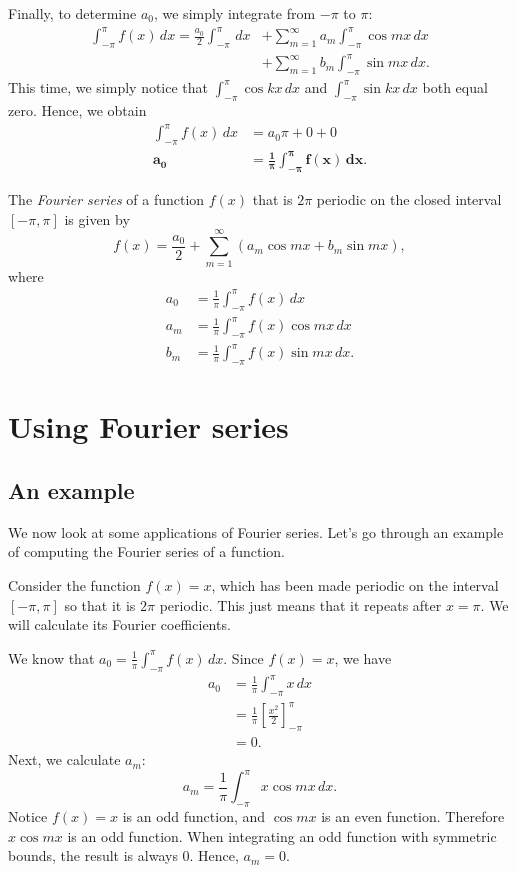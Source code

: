 \documentclass{amsart}
\begin{document}
  Finally, to determine $a_0$, we simply integrate from $-\pi$ to $\pi$:
  \begin{align*}
    \int_{-\pi}^{\pi} f(x)\, dx = \frac{a_0}{2} \int_{-\pi}^{\pi} \, dx &+ \sum_{m=1}^{\infty} a_m \int_{-\pi}^{\pi} \cos mx\, dx \\
                                &+ \sum_{m=1}^{\infty} b_m \int_{-\pi}^{\pi} \sin mx\, dx.
  \end{align*}
  This time, we simply notice that $\int_{-\pi}^{\pi} \cos kx\, dx $ and $\int_{-\pi}^{\pi} \sin kx\, dx$ both equal zero. Hence, we obtain 
  \begin{align*}
    \int_{-\pi}^{\pi} f(x) \, dx &= a_0 \pi + 0 + 0 \\
    \bm{a_0} &\bm{= \frac{1}{\pi} \int_{-\pi}^{\pi} f(x) \, dx}. 
  \end{align*}
  \begin{definition}
    The \emph{Fourier series} of a function $f(x)$ that is $2\pi$ periodic on the closed interval  $[-\pi, \pi]$ is given by \[
      f(x) = \frac{a_0}{2} + \sum_{m=1}^{\infty} (a_m \cos mx + b_m \sin mx)
    ,\] where 
    \begin{align*}
      a_0 &= \frac{1}{\pi}\int_{-\pi}^{\pi} f(x)\, dx \\
      a_m &= \frac{1}{\pi}\int_{-\pi}^{\pi} f(x)\cos mx\, dx \\
      b_m &= \frac{1}{\pi}\int_{-\pi}^{\pi} f(x)\sin mx\, dx.
    \end{align*}
  \end{definition}

  \section{Using Fourier series}
  \subsection{An example}

  We now look at some applications of Fourier series. Let's go through an example of computing the Fourier series of a function.

  Consider the function $f(x) = x$, which has been made periodic on the interval $[-\pi, \pi]$ so that it is $2\pi$ periodic. This just means that it repeats after $x = \pi$. We will calculate its Fourier coefficients.

  We know that $a_0 = \frac{1}{\pi} \int_{-\pi}^{\pi} f(x) \, dx$. Since $f(x) = x$, we have 
  \begin{align*}
    a_0 &= \frac{1}{\pi} \int_{-\pi}^{\pi} x\, dx \\
        &= \frac{1}{\pi} \left[ \frac{x^2}{2} \right]_{-\pi}^{\pi} \\
        &= 0.
  \end{align*}
  Next, we calculate $a_m$:
  \begin{equation*}
    a_m = \frac{1}{\pi} \int_{-\pi}^{\pi} x\cos mx \, dx.
  \end{equation*}
  Notice $f(x) = x$ is an odd function, and $\cos mx$ is an even function. Therefore $x\cos mx$ is an odd function. When integrating an odd function with symmetric bounds, the result is always 0. Hence, $a_m = 0$.
\end{document}
